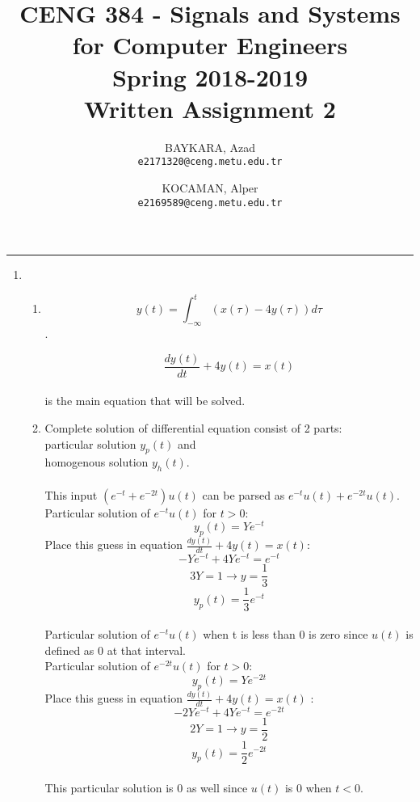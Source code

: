 \documentclass[10pt,a4paper, margin=1in]{article}
\author{
  BAYKARA, Azad\\
  \texttt{e2171320@ceng.metu.edu.tr}
  \and
  KOCAMAN, Alper\\
  \texttt{e2169589@ceng.metu.edu.tr}
}
\title{CENG 384 - Signals and Systems for Computer Engineers \\
Spring 2018-2019 \\
Written Assignment 2}
\begin{document}
\maketitle



\noindent\rule{19cm}{1.2pt}

\begin{enumerate}

\item 
    \begin{enumerate}
    \item %
    \[y(t) = \int_{-\infty}^{t} (x(\tau) - 4y(\tau) )d\tau\].
    
    \[ \frac{dy(t)}{dt}+4y(t)= x(t)\] \\is the main equation that will be solved. 
    \item %
    
    Complete solution of differential equation consist of 2 parts:\\
    particular solution $y_p(t)$ and \\
    homogenous solution $y_h(t)$.\\\\
    
    This input $(e^{-t}+e^{-2t})u(t)$ can be parsed as $e^{-t}u(t) + e^{-2t}u(t)$.\\
    
    Particular solution of $e^{-t}u(t)$ for $t>0$:\\
    \[ y_p(t) = Ye^{-t} \]
    Place this guess in equation $\frac{dy(t)}{dt}+4y(t)= x(t)$:
    \[ -Ye^{-t}+4Ye^{-t} = e^{-t} \]
    \[ 3Y = 1 \rightarrow y = \frac{1}{3} \]
    \[ y_p(t) = \frac{1}{3} e^{-t} \]\\
    
    Particular solution of $e^{-t}u(t)$ when t is less than 0 is zero since $u(t)$ is defined as 0 at that interval.\\
    
    Particular solution of $e^{-2t}u(t)$ for $t>0$:\\
    \[ y_p(t) = Ye^{-2t} \]
    Place this guess in equation $\frac{dy(t)}{dt}+4y(t)= x(t)$ :
    \[ -2Ye^{-t}+4Ye^{-t} = e^{-2t} \]
    \[ 2Y = 1 \rightarrow y = \frac{1}{2} \]
    \[ y_p(t) = \frac{1}{2} e^{-2t} \]\\
    
    This particular solution is 0 as well since $u(t)$ is 0 when $t<0$.\\
    

\end{enumerate}
\end{enumerate}
\end{document}
